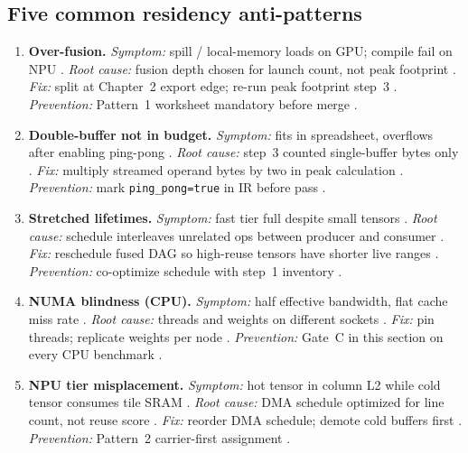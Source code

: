 \subsection{Five common residency anti-patterns}
\begin{enumerate}
\item \textbf{Over-fusion.}
\emph{Symptom:} spill / local-memory loads on GPU; compile fail on NPU \citep{memoryfloor2026,yirage2026}.
\emph{Root cause:} fusion depth chosen for launch count, not peak footprint \citep{taxbreak2026,wu2024mirage}.
\emph{Fix:} split at Chapter~2 export edge; re-run peak footprint step~3 \citep{chen2020compilerbasedhardw}.
\emph{Prevention:} Pattern~1 worksheet mandatory before merge \citep{yirage2026}.

\item \textbf{Double-buffer not in budget.}
\emph{Symptom:} fits in spreadsheet, overflows after enabling ping-pong \citep{semianalysis2024tma,dao2022flashattention}.
\emph{Root cause:} step~3 counted single-buffer bytes only \citep{yirage2026,memoryfloor2026}.
\emph{Fix:} multiply streamed operand bytes by two in peak calculation \citep{yirage2026}.
\emph{Prevention:} mark \texttt{ping\_pong=true} in IR before pass \citep{rotem2018glow,chen2020compilerbasedhardw}.

\item \textbf{Stretched lifetimes.}
\emph{Symptom:} fast tier full despite small tensors \citep{wu2024mirage,dlbook}.
\emph{Root cause:} schedule interleaves unrelated ops between producer and consumer \citep{taxbreak2026,patel2025llminference}.
\emph{Fix:} reschedule fused DAG so high-reuse tensors have shorter live ranges \citep{taxbreak2026}.
\emph{Prevention:} co-optimize schedule with step~1 inventory \citep{wu2024mirage,yirage2026}.

\item \textbf{NUMA blindness (CPU).}
\emph{Symptom:} half effective bandwidth, flat cache miss rate \citep{patel2025llminference,memoryfloor2026}.
\emph{Root cause:} threads and weights on different sockets \citep{dlbook,kwon2023vllm}.
\emph{Fix:} pin threads; replicate weights per node \citep{dlbook}.
\emph{Prevention:} Gate~C in this section on every CPU benchmark \citep{patel2025llminference,taxbreak2026}.

\item \textbf{NPU tier misplacement.}
\emph{Symptom:} hot tensor in column L2 while cold tensor consumes tile SRAM \citep{amd2024aie,amd2024xdna}.
\emph{Root cause:} DMA schedule optimized for line count, not reuse score \citep{yirage2026,patel2025llminference}.
\emph{Fix:} reorder DMA schedule; demote cold buffers first \citep{yirage2026,patel2025llminference}.
\emph{Prevention:} Pattern~2 carrier-first assignment \citep{dao2022flashattention,amd2024aie}.
\end{enumerate}

